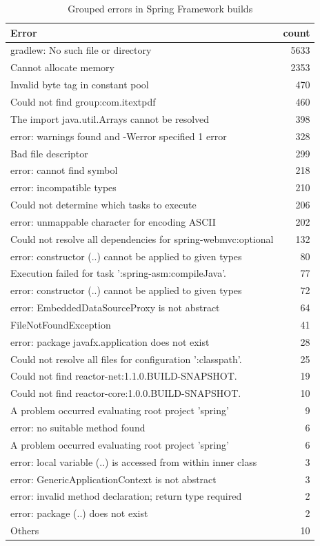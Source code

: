\begin{table}
	\caption{Grouped errors in Spring Framework builds}
	\label{table:springErrors}
	\begin{center}
	\begin{tabular}{lr}
		\toprule
		\bf{Error} & \bf{count} \\ 
		\midrule
		gradlew: No such file or directory& 5633  \\
		Cannot allocate memory & 2353  \\
		Invalid byte tag in constant pool & 470   \\
		Could not find group:com.itextpdf & 460   \\
		The import java.util.Arrays cannot be resolved & 398   \\
		error: warnings found and -Werror specified 1 error & 328   \\
		Bad file descriptor & 299   \\
		error: cannot find symbol & 218   \\
		error: incompatible types & 210   \\
		Could not determine which tasks to execute  & 206   \\
		error: unmappable character for encoding ASCII  & 202   \\
		Could not resolve all dependencies for spring-webmvc:optional & 132   \\
		error: constructor (..) cannot be applied to given types & 80 \\
		Execution failed for task ':spring-asm:compileJava'. & 77    \\
		error: constructor (..) cannot be applied to given types & 72    \\
		error: EmbeddedDataSourceProxy is not abstract & 64    \\
		FileNotFoundException & 41    \\
		error: package javafx.application does not exist & 28    \\
		Could not resolve all files for configuration ':classpath'. & 25    \\
		Could not find reactor-net:1.1.0.BUILD-SNAPSHOT. & 19    \\
		Could not find reactor-core:1.0.0.BUILD-SNAPSHOT. & 10    \\
		A problem occurred evaluating root project 'spring' & 9 \\
		error: no suitable method found & 6 \\
		A problem occurred evaluating root project 'spring' & 6     \\
		error: local variable (..) is accessed from within inner class & 3     \\
		error: GenericApplicationContext is not abstract & 3     \\                                                                       
		error: invalid method declaration; return type required & 2  \\
		error: package (..) does not exist & 2 \\    
		Others & 10 \\
		\bottomrule
	\end{tabular}
	\end{center}
\end{table}


